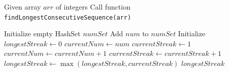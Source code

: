 \begin{algorithm}[H]
\caption{Find Length of Longest Consecutive Sequence}
\begin{algorithmic}[1]
\STATE Given array $arr$ of integers
\STATE Call function \texttt{findLongestConsecutiveSequence(arr)}

    \ENDIF
    \STATE Initialize empty HashSet $numSet$
        \STATE Add $num$ to $numSet$
    \ENDFOR
    \STATE Initialize $longestStreak \gets 0$
            \STATE $currentNum \gets num$
            \STATE $currentStreak \gets 1$
                \STATE $currentNum \gets currentNum + 1$
                \STATE $currentStreak \gets currentStreak + 1$
            \ENDWHILE
            \STATE $longestStreak \gets \max(longestStreak, currentStreak)$
        \ENDIF
    \ENDFOR
    \RETURN $longestStreak$
\ENDFUNCTION

\end{algorithmic}
\end{algorithm}